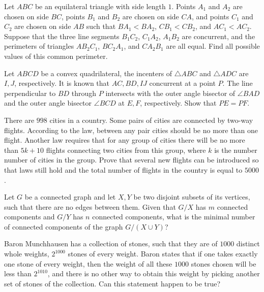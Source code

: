 \documentclass[11pt]{scrartcl}
\begin{document}
\begin{problem}[803002459788170506]
	Let $ABC$ be an equilateral triangle with side length $1$. Points $A_1$ and $A_2$ are chosen on side $BC$, points $B_1$ and $B_2$ are chosen on side $CA$, and points $C_1$ and $C_2$ are chosen on side $AB$ such that $BA_1<BA_2$, $CB_1<CB_2$, and $AC_1<AC_2$.
Suppose that the three line segments $B_1C_2$, $C_1A_2$, $A_1B_2$ are concurrent, and the perimeters of triangles $AB_2C_1$, $BC_2A_1$, and $CA_2B_1$ are all equal. Find all possible values of this common perimeter.
\end{problem}
\begin{problem}[4308913658510445082]
Let $ABCD$ be a convex quadrilateral, the incenters of $\triangle ABC$ and $\triangle ADC$ are $I,J$, respectively. It is known that $AC,BD,IJ$ concurrent at a point $P$. The line perpendicular to $BD$ through $P$ intersects with the outer angle bisector of $\angle BAD$ and the outer angle bisector $\angle BCD$ at $E,F$, respectively. Show that $PE=PF$.
\end{problem}
\begin{problem}[521339998508550]
There are $998$ cities in a country. Some pairs of cities are connected by two-way flights. According to the law, between any pair cities should be no more than one flight. Another law requires that for any group of cities there will be no more than $5k+10$ flights connecting two cities from this group, where $k$ is the number number of cities in the group. Prove that several new flights can be introduced so that laws still hold and the total number of flights in the country is equal to $5000$.
\end{problem}
\begin{problem}[8612979541975584705]
	Let $G$ be a connected graph and let $X, Y$ be two disjoint subsets of its vertices, such that there are no edges between them. Given that $G/X$ has $m$ connected components and $G/Y$ has $n$ connected components, what is the minimal number of connected components of the graph $G/(X \cup Y)$?
\end{problem}
\begin{problem}[9055967412808709037]
Baron Munchhausen has a collection of stones, such that they are of $1000$ distinct whole weights, $2^{1000}$ stones of every weight. Baron states that if one takes exactly one stone of every weight, then the weight of all these $1000$ stones chosen will be less than $2^{1010}$, and there is no other way to obtain this weight by picking another set of stones of the collection.
Can this statement happen to be true?
\end{problem}
\end{document}
